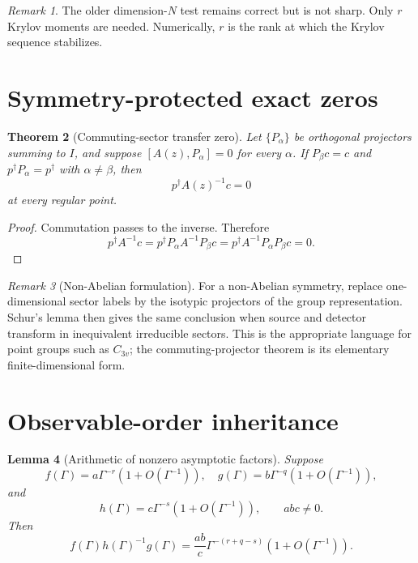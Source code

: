 \documentclass[11pt,a4paper]{article}
\newtheorem{theorem}{Theorem}[section]
\newtheorem{lemma}[theorem]{Lemma}
\theoremstyle{remark}
\newtheorem{remark}[theorem]{Remark}
\begin{document}
\begin{remark}
The older dimension-$N$ test remains correct but is not sharp.  Only $r$
Krylov moments are needed.  Numerically, $r$ is the rank at which the Krylov
sequence stabilizes.
\end{remark}

\section{Symmetry-protected exact zeros}

\begin{theorem}[Commuting-sector transfer zero]
Let $\{P_\alpha\}$ be orthogonal projectors summing to $I$, and suppose
$[A(z),P_\alpha]=0$ for every $\alpha$.  If
$P_\beta c=c$ and $p^\dagger P_\alpha=p^\dagger$ with $\alpha\ne\beta$,
then
\[
p^\dagger A(z)^{-1}c=0
\]
at every regular point.
\end{theorem}

\begin{proof}
Commutation passes to the inverse.  Therefore
\[
p^\dagger A^{-1}c
=p^\dagger P_\alpha A^{-1}P_\beta c
=p^\dagger A^{-1}P_\alpha P_\beta c=0.
\]
\end{proof}

\begin{remark}[Non-Abelian formulation]
For a non-Abelian symmetry, replace one-dimensional sector labels by the
isotypic projectors of the group representation.  Schur's lemma then gives the
same conclusion when source and detector transform in inequivalent irreducible
sectors.  This is the appropriate language for point groups such as
$C_{3v}$; the commuting-projector theorem is its elementary finite-dimensional
form.
\end{remark}

\section{Observable-order inheritance}

\begin{lemma}[Arithmetic of nonzero asymptotic factors]
Suppose
\[
f(\Gamma)=a\Gamma^{-r}(1+O(\Gamma^{-1})),\quad
g(\Gamma)=b\Gamma^{-q}(1+O(\Gamma^{-1})),
\]
and
\[
h(\Gamma)=c\Gamma^{-s}(1+O(\Gamma^{-1})),
\qquad abc\ne0.
\]
Then
\[
f(\Gamma)h(\Gamma)^{-1}g(\Gamma)
=\frac{ab}{c}\Gamma^{-(r+q-s)}(1+O(\Gamma^{-1})).
\]
\end{lemma}
\end{document}
